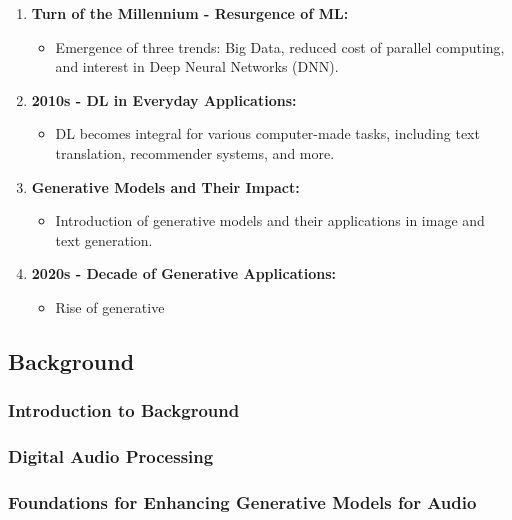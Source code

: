 \begin{frame}
\begin{enumerate}
        \item \textbf{Turn of the Millennium - Resurgence of ML:}
              \begin{itemize}
                  \item Emergence of three trends: Big Data, reduced cost of parallel computing, and interest in Deep Neural Networks (DNN).
              \end{itemize}

        \item \textbf{2010s - DL in Everyday Applications:}
              \begin{itemize}
                  \item DL becomes integral for various computer-made tasks, including text translation, recommender systems, and more.
              \end{itemize}

        \item \textbf{Generative Models and Their Impact:}
              \begin{itemize}
                  \item Introduction of generative models and their applications in image and text generation.
              \end{itemize}

        \item \textbf{2020s - Decade of Generative Applications:}
              \begin{itemize}
                  \item Rise of generative
              \end{itemize}
    \end{enumerate}
\end{frame}


\subsection{Background}

\begin{frame}
    \frametitle{Introduction to Background}
\end{frame}

\begin{frame}
    \frametitle{Digital Audio Processing}
\end{frame}

\begin{frame}
    \frametitle{Foundations for Enhancing Generative Models for Audio}
\end{frame}

